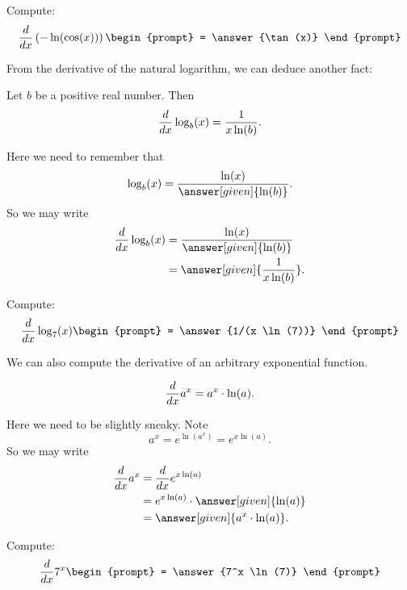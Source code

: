 \documentclass{ximera}
\begin{document}
\begin{question}
  Compute:
  \[
  \ddx \left(-\ln(\cos(x))\right)
  \begin{prompt}
    = \answer{\tan(x)}
  \end{prompt}
  \]
\end{question}



From the derivative of the natural logarithm, we can deduce another fact:

\begin{theorem}
  Let $b$ be a positive real number. Then
  \[
  \frac{d}{dx} \log_b(x) = \frac{1}{x\ln(b)}.
  \]
  \begin{explanation}
    Here we need to remember that
    \[
    \log_b(x) = \frac{\ln(x)}{\answer[given]{\ln(b)}}.
    \]
    So we may write
    \begin{align*}
      \ddx \log_b(x) &= \frac{\ln(x)}{\answer[given]{\ln(b)}}\\
      &= \answer[given]{\frac{1}{x\ln(b)}}.
    \end{align*}
  \end{explanation}
\end{theorem}

\begin{question}
  Compute:
  \[
  \ddx \log_7(x)
  \begin{prompt}
    = \answer{1/(x \ln(7))}
  \end{prompt}
  \]
\end{question}


We can also compute the derivative of an arbitrary exponential
function.

\begin{theorem}
  \[
  \frac{d}{dx} a^x = a^x\cdot \ln(a).
  \]
  \begin{explanation}
    Here we need to be slightly sneaky. Note
    \[
    a^x = e^{\ln(a^x)} = e^{x\ln(a)}.
    \]
    So we may write
    \begin{align*}
      \ddx a^x &= \ddx e^{x\ln(a)}\\
      &= e^{x\ln(a)} \cdot \answer[given]{\ln(a)}\\
      &= \answer[given]{a^x\cdot \ln(a)}.
    \end{align*}
  \end{explanation}
\end{theorem}

\begin{question}
  Compute:
  \[
  \ddx 7^x
  \begin{prompt}
    = \answer{7^x \ln(7)}
  \end{prompt}
  \]
\end{question}
\end{document}

